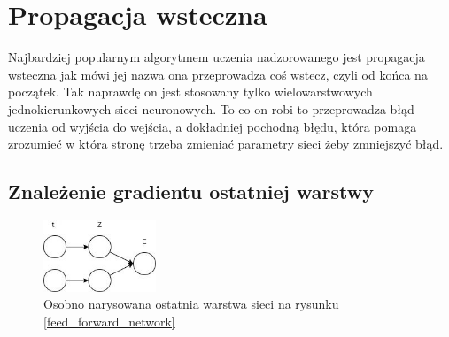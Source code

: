 \documentclass{article}
\begin{document}
\section{Propagacja wsteczna}
Najbardziej popularnym algorytmem uczenia nadzorowanego jest propagacja wsteczna jak mówi jej nazwa ona przeprowadza coś wstecz, czyli od końca na początek. Tak naprawdę on jest stosowany tylko wielowarstwowych jednokierunkowych sieci neuronowych. To co on robi to przeprowadza błąd uczenia od wyjścia do wejścia, a dokładniej pochodną błędu, która pomaga zrozumieć w która stronę trzeba zmieniać parametry sieci żeby zmniejszyć błąd. \cite{nn_jozef}

\subsection{Znależenie gradientu ostatniej warstwy}
\begin{figure}[H]
	\centering
	\includegraphics[width=0.3\textwidth,keepaspectratio=true]{feed_forward_error}
	\caption{Osobno narysowana ostatnia warstwa sieci na rysunku \ref{feed_forward_network}}
	\label{feed_forward_error}
\end{figure}
\end{document}
